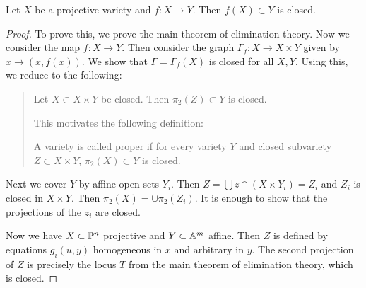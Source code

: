 \documentclass[twoside, 10pt]{article}
\begin{document}
    \begin{thm} Let $X$ be a projective variety and $f:X \to Y$. Then $f(X)
        \subset Y$ is closed.  \begin{proof} To prove this, we prove the main
            theorem of elimination theory. Now we consider the map $f:X \to Y$.
            Then consider the graph $\Gamma_f: X \to X \times Y$ given by $x
            \to (x,f(x))$. We show that $\Gamma = \Gamma_f(X)$ is closed for
            all $X,Y$. Using this, we reduce to the following: \begin{quote}
                \begin{thm} Let $X \subset X \times Y$ be closed. Then
                    $\pi_2(Z) \subset Y$ is closed.  \end{thm} This motivates
                    the following definition: \begin{defn} A variety is called
                        proper if for every variety $Y$ and closed subvariety
                        $Z \subset X \times Y$, $\pi_2(X) \subset Y$ is closed.
                    \end{defn} \end{quote} Next we cover $Y$ by affine open
                    sets $Y_i$. Then $Z = \bigcup z \cap (X \times Y_i) = Z_i$
                    and $Z_i$ is closed in $X \times Y$.  Then $\pi_2(X) = \cup
                    \pi_2(Z_i)$. It is enough to show that the projections of
                    the $z_i$ are closed.

            Now we have $X \subset \P^n$ projective and $Y \subset \A^m$
            affine. Then $Z$ is defined by equations $g_i(u,y)$ homogeneous in
            $x$ and arbitrary in $y$. The second projection of $Z$ is precisely
            the locus $T$ from the main theorem of elimination theory, which is
        closed.  \end{proof} \end{thm}
\end{document}

